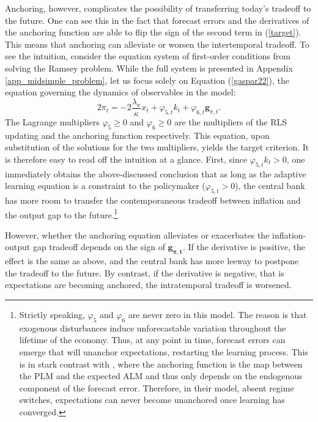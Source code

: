 \documentclass[11pt]{article}
\renewcommand{\[}{\begin{equation}}
\renewcommand{\]}{\end{equation}}
\begin{document}
Anchoring, however, complicates the possibility of transferring today's tradeoff to the future. One can see this in the fact that forecast errors and the derivatives of the anchoring function are able to flip the sign of the second term in (\ref{target}). This means that anchoring can alleviate or worsen the intertemporal tradeoff. To see the intuition, consider the equation system of first-order conditions from solving the Ramsey problem. While the full system is presented in Appendix \ref{app_midsimple_problem}, let us focus solely on Equation (\ref{gaspar22}), the equation governing the dynamics of observables in the model:
\begin{equation}
2\pi_t = - 2\frac{\lambda_x}{\kappa}x_t +\varphi_{5,t} k_t + \varphi_{6,t} \mathbf{g}_{\pi,t} .
\end{equation}
The Lagrange multipliers $\varphi_5 \geq 0$ and $\varphi_6 \geq 0$ are the multipliers of the RLS updating and the anchoring function respectively. This equation, upon substitution of the solutions for the two multipliers, yields the target criterion. It is therefore easy to read off the intuition at a glance. First, since $\varphi_{5,t}k_t > 0$, one immediately obtains the above-discussed conclusion that as long as the adaptive learning equation is a constraint to the policymaker ($\varphi_{5,t} > 0$), the central bank has more room to transfer the contemporaneous tradeoff between inflation and the output gap to the future.\footnote{Strictly speaking, $\varphi_5$ and $\varphi_6$ are never zero in this model. The reason is that exogenous disturbances induce unforecastable variation throughout the lifetime of the economy. Thus, at any point in time, forecast errors can emerge that will unanchor expectations, restarting the learning process. This is in stark contrast with \cite{carvalho2019anchored}, where the anchoring function is the map between the PLM and the expected ALM and thus only depends on the endogenous component of the forecast error. Therefore, in their model, absent regime switches, expectations can never become unanchored once learning has converged.}

However, whether the anchoring equation alleviates or exacerbates the inflation-output gap tradeoff depends on the sign of $\mathbf{g_{\pi,t}}$. If the derivative is positive, the effect is the same as above, and the central bank has more leeway to postpone the tradeoff to the future. By contrast, if the derivative is negative, that is expectations are becoming anchored, the intratemporal tradeoff is worsened.
\end{document}
